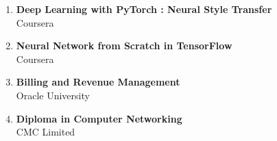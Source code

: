 \documentclass[11pt,a4paper]{article} %
\begin{document}
\spacedhrule{0.3em}{0.5em} %



\vspace{.2cm}

\begin{enumerate}
	\item {\noindent {} {\textbf{Deep Learning with PyTorch : Neural Style Transfer}} \\
	{Coursera}}
	\item {\noindent {} {\textbf{Neural Network from Scratch in TensorFlow}} \\
			{Coursera}}
	\item {\noindent {} {\textbf{Billing and Revenue Management}} \\
			{Oracle University}}
	\item {\noindent {} {\textbf{Diploma in Computer Networking}} \\
			{CMC Limited}}
\end{enumerate}

\spacedhrule{-0.3em}{0.5em} %


\end{document}
